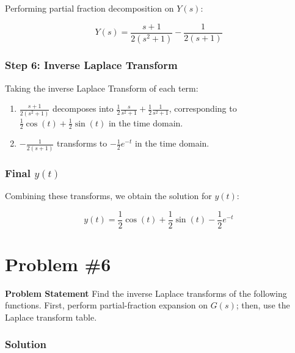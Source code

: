 \documentclass[12pt]{article}
\begin{document}
Performing partial fraction decomposition on \( Y(s) \):

\[
Y(s) = \frac{s + 1}{2(s^2 + 1)} - \frac{1}{2(s + 1)}
\]

\subsubsection*{Step 6: Inverse Laplace Transform}

Taking the inverse Laplace Transform of each term:

\begin{enumerate}
    \item \(\frac{s + 1}{2(s^2 + 1)}\) decomposes into \(\frac{1}{2} \frac{s}{s^2 + 1} + \frac{1}{2} \frac{1}{s^2 + 1}\), corresponding to \(\frac{1}{2} \cos(t) + \frac{1}{2} \sin(t)\) in the time domain.
    \item \(-\frac{1}{2(s + 1)}\) transforms to \(-\frac{1}{2} e^{-t}\) in the time domain.
\end{enumerate}

\subsubsection*{Final \(y(t)\)}

Combining these transforms, we obtain the solution for \( y(t) \):

\[
y(t) = \frac{1}{2} \cos(t) + \frac{1}{2} \sin(t) - \frac{1}{2} e^{-t}
\]
\newpage
\section*{Problem \#6}
\textbf{Problem Statement}
Find the inverse Laplace transforms of the following functions. First, perform partial-fraction expansion on \( G(s) \); then, use the Laplace transform table.

\subsubsection*{Solution}
\end{document}
